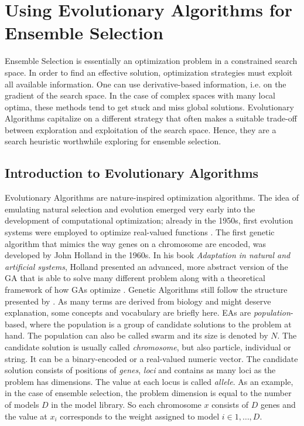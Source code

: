 \section{Using Evolutionary Algorithms for Ensemble Selection}
\label{UsingEA}
Ensemble Selection is essentially an optimization problem in a constrained search space. In order to find an effective solution, optimization strategies must exploit all available information. One can use derivative-based information, i.e. on the gradient of the search space. In the case of complex spaces with many local optima, these methods tend to get stuck and miss global solutions. Evolutionary Algorithms capitalize on a different strategy that often makes a suitable trade-off between exploration and exploitation of the search space. Hence, they are a search heuristic worthwhile exploring for ensemble selection.

\subsection{Introduction to Evolutionary Algorithms}
\label{introEA}
Evolutionary Algorithms are nature-inspired optimization algorithms. The idea of emulating natural selection and evolution emerged very early into the development of computational optimization; already in the 1950s, first evolution systems were employed to optimize real-valued functions \cite[p. 2]{mitchell1999introduction}. The first genetic algorithm that mimics the way genes on a chromosome are encoded, was developed by John Holland in the 1960s. In his book \emph{Adaptation in natural and artificial systems}, Holland presented an advanced, more abstract version of the GA that is able to solve many different problem along with a theoretical framework of how GAs optimize \citep{holland1975adaptation}. Genetic Algorithms still follow the structure presented by \citeauthor{holland1975adaptation}. As many terms are derived from biology and might deserve explanation, some concepts and vocabulary are briefly here. EAs are \emph{population}-based, where the population is a group of candidate solutions to the problem at hand. The population can also be called swarm and its size is denoted by $N$. The candidate solution is usually called \emph{chromosome}, but also particle, individual or string. It can be a binary-encoded or a real-valued numeric vector. The candidate solution consists of positions of \emph{genes}, \emph{loci} and contains as many loci as the problem has dimensions. The value at each locus is called \emph{allele}. As an example, in the case of ensemble selection, the problem dimension is equal to the number of models $D$ in the model library. So each chromosome $x$ consists of $D$ genes and the value at $x_i$ corresponds to the weight assigned to model $i \in 1,\dots, D$.

